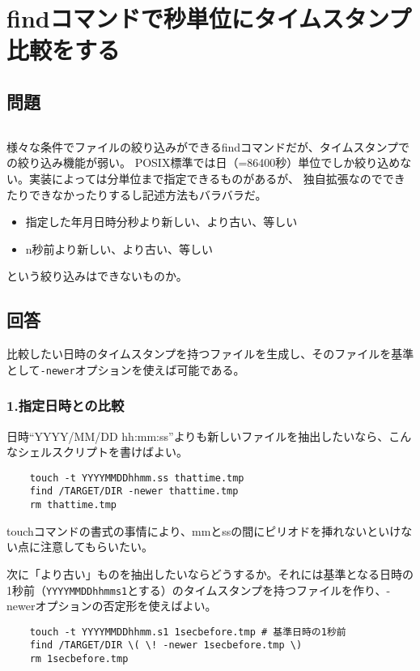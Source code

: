 \section{findコマンドで秒単位にタイムスタンプ比較をする}
\label{recipe:timestamp}

\subsection*{問題}
\noindent
$\!\!\!\!\!$
\begin{grshfboxit}{160.0mm}
	様々な条件でファイルの絞り込みができるfindコマンドだが、タイムスタンプでの絞り込み機能が弱い。
	POSIX標準では日（=86400秒）単位でしか絞り込めない。実装によっては分単位まで指定できるものがあるが、
	独自拡張なのでできたりできなかったりするし記述方法もバラバラだ。
	\begin{itemize}
	  \item 指定した年月日時分秒より新しい、より古い、等しい
	  \item n秒前より新しい、より古い、等しい
	\end{itemize}
	という絞り込みはできないものか。
\end{grshfboxit}

\subsection*{回答}
比較したい日時のタイムスタンプを持つファイルを生成し、そのファイルを基準として\verb|-newer|オプションを使えば可能である。

\subsubsection*{1.指定日時との比較}

日時``YYYY/MM/DD hh:mm:ss''よりも新しいファイルを抽出したいなら、こんなシェルスクリプトを書けばよい。\\
\begin{frameboxit}{160.0mm}
\begin{verbatim}
	touch -t YYYYMMDDhhmm.ss thattime.tmp
	find /TARGET/DIR -newer thattime.tmp
	rm thattime.tmp
\end{verbatim}
\end{frameboxit}

touchコマンドの書式の事情により、mmとssの間にピリオドを挿れないといけない点に注意してもらいたい。

次に「より古い」ものを抽出したいならどうするか。それには基準となる日時の1秒前（\verb|YYYYMMDDhhmms1|とする）のタイムスタンプを持つファイルを作り、-newerオプションの否定形を使えばよい。\\
\begin{frameboxit}{160.0mm}
\begin{verbatim}
	touch -t YYYYMMDDhhmm.s1 1secbefore.tmp # 基準日時の1秒前
	find /TARGET/DIR \( \! -newer 1secbefore.tmp \)
	rm 1secbefore.tmp
\end{verbatim}
\end{frameboxit}

